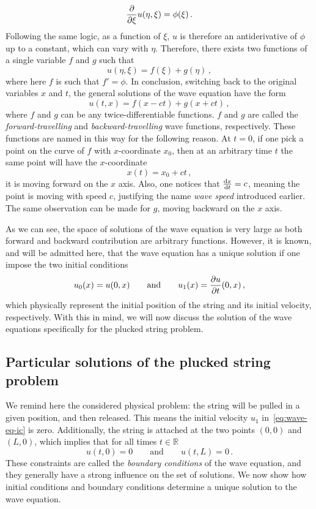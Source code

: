 \begin{equation}
  \frac{\partial }{\partial \xi}u(\eta,\xi)=\phi(\xi)\,.
\end{equation}
Following the same logic, as a function of $\xi$, $u$ is therefore an antiderivative of
$\phi$ up to a constant, which can vary with $\eta$. Therefore, there exists two functions
of a single variable $f$ and $g$ such that
\begin{equation}
  u(\eta,\xi)=f(\xi)+g(\eta)\,,
\end{equation}
where here $f$ is such that $f'=\phi$. In conclusion, switching back to the original
variables $x$ and $t$, the general solutions of the wave equation have the form
\begin{equation}
  \boxed{u(t,x)=f(x-ct)+g(x+ct)\,,}\label{eq:wave-eq-sol}
\end{equation}
where $f$ and $g$ can be any twice-differentiable functions. $f$ and $g$ are called the
\emph{forward-travelling} and \emph{backward-travelling} wave functions, respectively.
These functions are named in this way for the following reason. At $t=0$, if one pick a
point on the curve of $f$ with $x$-coordinate $x_0$, then at an arbitrary time $t$ the
same point will have the $x$-coordinate
\begin{equation}
  x(t)=x_0+ct\,,
\end{equation}
\ie it is moving forward on the $x$ axis. Also, one notices that $\frac{\mathrm{d} x}{\mathrm{d} t}=c$, meaning
the point is moving with speed $c$, justifying the name \emph{wave speed} introduced
earlier. The same observation can be made for $g$, moving backward on the $x$ axis.

As we can see, the space of solutions of the wave equation is very large as both forward
and backward contribution are arbitrary functions. However, it is known, and will be
admitted here, that the wave equation has a unique solution if one impose the two initial
conditions
\begin{equation}
  u_0(x)=u(0,x)\qquad\text{and}\qquad u_1(x)=\frac{\partial u}{\partial t}(0,x)\,,\label{eq:wave-eq-ic}
\end{equation}
which physically represent the initial position of the string and its initial velocity,
respectively. With this in mind, we will now discuss the solution of the wave equations
specifically for the plucked string problem.
%
\subsection{Particular solutions of the plucked string problem}
We remind here the considered physical problem: the string will be pulled in a given
position, and then released. This means the initial velocity $u_1$ in~\cref{eq:wave-eq-ic}
is zero. Additionally, the string is attached at the two points $(0,0)$ and $(L,0)$, which
implies that for all times $t\in\mathbb{R}$
\begin{equation}
  u(t,0)=0\qquad\text{and}\qquad u(t,L)=0\,.\label{eq:string-bc}
\end{equation}
These constraints are called the \emph{boundary conditions} of the wave equation, and they
generally have a strong influence on the set of solutions. We now show how initial
conditions and boundary conditions determine a unique solution to the wave equation.

